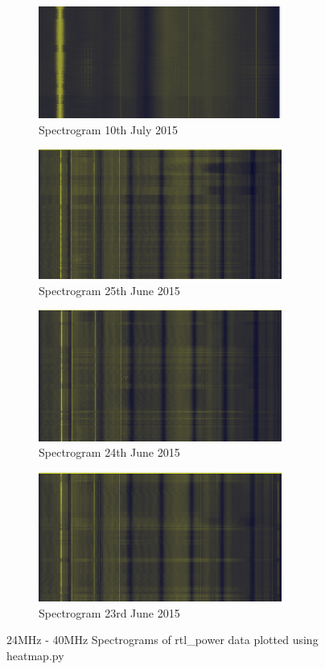 \documentclass[runningheads,a4paper]{llncs}
\begin{document}
%
\begin{figure}	
	\centering
	\begin{subfigure}[t]{8cm}
		\centering
		\includegraphics[width=8cm]{images/81}
		\caption{Spectrogram 10th July 2015}
		\label{fig:rtl_power_spectrogram_05} 
	\end{subfigure}
	\quad
	\begin{subfigure}[t]{8cm}
		\centering
		\includegraphics[width=8cm]{images/82}
		\caption{Spectrogram 25th June 2015}
		\label{fig:rtl_power_spectrogram_06} 
	\end{subfigure}
	\quad
	\begin{subfigure}[t]{8cm}
		\centering
		\includegraphics[width=8cm]{images/83}
		\caption{Spectrogram 24th June 2015}
		\label{fig:rtl_power_spectrogram_07} 
	\end{subfigure}
	\quad
	\begin{subfigure}[t]{8cm}
		\centering
		\includegraphics[width=8cm]{images/84}
		\caption{Spectrogram 23rd June 2015}
		\label{fig:rtl_power_spectrogram_08} 
	\end{subfigure}
	\quad
	\caption{24MHz - 40MHz Spectrograms of rtl\_power data plotted using heatmap.py}\label{fig:rtl_power_spectrogram_dam}
\end{figure}
%
\end{document}
